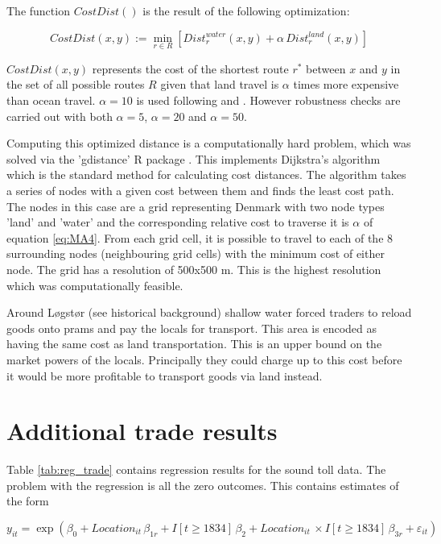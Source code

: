 The function $CostDist()$ is the result of the following optimization:

\begin{equation}
\label{eq:MA4}
CostDist(x, y):=\min_{r\in R}\left[Dist^{water}_r(x, y) + \alpha\, Dist^{land}_r(x, y)\right]
\end{equation}

$CostDist(x,y)$ represents the cost of the shortest route $r^*$ between $x$ and $y$ in the set of all possible routes $R$ given that land travel is $\alpha$ times more expensive than ocean travel. $\alpha = 10$ is used following \cite{Marczinek2022} and \cite{rauch2022a}. However robustness checks are carried out with both $\alpha = 5$, $\alpha = 20$ and $\alpha = 50$. 

Computing this optimized distance is a computationally hard problem, which was solved via the 'gdistance' R package \citep{VanEtten2017}. This implements Dijkstra's algorithm \citep{Dijkstra1959} which is the standard method for calculating cost distances. The algorithm takes a series of nodes with a given cost between them and finds the least cost path. The nodes in this case are a grid representing Denmark with two node types 'land' and 'water' and the corresponding relative cost to traverse it is $\alpha$ of equation \ref{eq:MA4}. From each grid cell, it is possible to travel to each of the 8 surrounding nodes (neighbouring grid cells) with the minimum cost of either node. The grid has a resolution of 500x500 m. This is the highest resolution which was computationally feasible. 

Around Løgstør (see historical background) shallow water forced traders to reload goods onto prams and pay the locals for transport. This area is encoded as having the same cost as land transportation. This is an upper bound on the market powers of the locals. Principally they could charge up to this cost before it would be more profitable to transport goods via land instead.

\section{Additional trade results}
Table \ref{tab:reg_trade} contains regression results for the sound toll data. The problem with the regression is all the zero outcomes. This contains estimates of the form

\begin{equation}
\label{eq:traf1}
y_{it} = \exp\left(\beta_0 + Location_{it}\,\beta_{1r} +  I[t\geq1834] \, \beta_2 + Location_{it}\,\times I[t\geq1834] \, \beta_{3r} + \varepsilon_{it}\right)
\end{equation}


